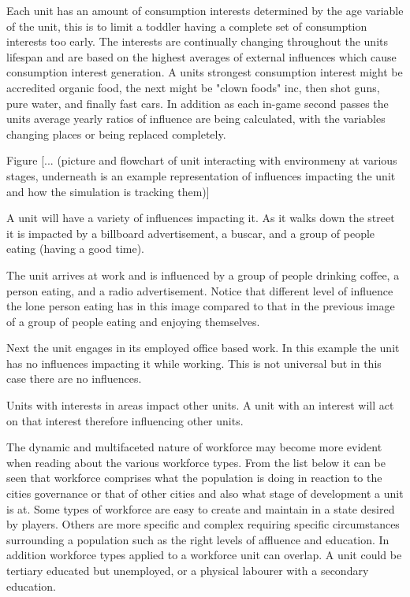 Each unit has an amount of consumption interests determined by the age variable of the unit, this is to limit a toddler having a complete set of consumption interests too early. The interests are continually changing throughout the units lifespan and are based on the highest averages of external influences which cause consumption interest generation. A units strongest consumption interest might be accredited organic food, the next might be "clown foods" inc, then shot guns, pure water, and finally fast cars. In addition as each in-game second passes the units average yearly ratios of influence are being calculated, with the variables changing places or being replaced completely.   
 

Figure [... (picture and flowchart of unit interacting with environmeny at various stages, underneath is an example representation of influences impacting the unit and how the simulation is tracking them)]

A unit will have a variety of influences impacting it. As it walks down the street it is impacted by a billboard advertisement, a buscar, and a group of people eating (having a good time).

The unit arrives at work and is influenced by a group of people drinking coffee, a person eating, and a radio advertisement. Notice that different level of influence the lone person eating has in this image compared to that in the previous image of a group of people eating and enjoying themselves.

Next the unit engages in its employed office based work. In this example the unit has no influences impacting it while working. This is not universal but in this case there are no influences.



Units with interests in areas impact other units.
A unit with an interest will act on that interest therefore influencing other units.



The dynamic and multifaceted nature of workforce may become more evident when reading about the various workforce types. From the list below it can be seen that workforce comprises what the population is doing in reaction to the cities governance or that of other cities and also what stage of development a unit is at. Some types of workforce are easy to create and maintain in a state desired by players. Others are more specific and complex requiring specific circumstances surrounding a population such as the right levels of affluence and education. In addition workforce types applied to a workforce unit can overlap. A unit could be tertiary educated but unemployed, or a physical labourer with a secondary education. 

